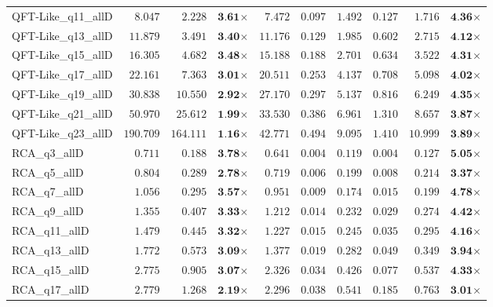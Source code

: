 \begin{table*}[t]
{\begin{tabular}{| l || r r c || r r r r r c |}
QFT-Like\_q11\_allD & $8.047$ & $2.228$ & $\textbf{3.61}$$\times$ & $7.472$ & $0.097$ & $1.492$ & $0.127$ & $1.716$ & $\textbf{4.36}$$\times$ \\
QFT-Like\_q13\_allD & $11.879$ & $3.491$ & $\textbf{3.40}$$\times$ & $11.176$ & $0.129$ & $1.985$ & $0.602$ & $2.715$ & $\textbf{4.12}$$\times$ \\
QFT-Like\_q15\_allD & $16.305$ & $4.682$ & $\textbf{3.48}$$\times$ & $15.188$ & $0.188$ & $2.701$ & $0.634$ & $3.522$ & $\textbf{4.31}$$\times$ \\
QFT-Like\_q17\_allD & $22.161$ & $7.363$ & $\textbf{3.01}$$\times$ & $20.511$ & $0.253$ & $4.137$ & $0.708$ & $5.098$ & $\textbf{4.02}$$\times$ \\
QFT-Like\_q19\_allD & $30.838$ & $10.550$ & $\textbf{2.92}$$\times$ & $27.170$ & $0.297$ & $5.137$ & $0.816$ & $6.249$ & $\textbf{4.35}$$\times$ \\
QFT-Like\_q21\_allD & $50.970$ & $25.612$ & $\textbf{1.99}$$\times$ & $33.530$ & $0.386$ & $6.961$ & $1.310$ & $8.657$ & $\textbf{3.87}$$\times$ \\
QFT-Like\_q23\_allD & $190.709$ & $164.111$ & $\textbf{1.16}$$\times$ & $42.771$ & $0.494$ & $9.095$ & $1.410$ & $10.999$ & $\textbf{3.89}$$\times$ \\
RCA\_q3\_allD & $0.711$ & $0.188$ & $\textbf{3.78}$$\times$ & $0.641$ & $0.004$ & $0.119$ & $0.004$ & $0.127$ & $\textbf{5.05}$$\times$ \\
RCA\_q5\_allD & $0.804$ & $0.289$ & $\textbf{2.78}$$\times$ & $0.719$ & $0.006$ & $0.199$ & $0.008$ & $0.214$ & $\textbf{3.37}$$\times$ \\
RCA\_q7\_allD & $1.056$ & $0.295$ & $\textbf{3.57}$$\times$ & $0.951$ & $0.009$ & $0.174$ & $0.015$ & $0.199$ & $\textbf{4.78}$$\times$ \\
RCA\_q9\_allD & $1.355$ & $0.407$ & $\textbf{3.33}$$\times$ & $1.212$ & $0.014$ & $0.232$ & $0.029$ & $0.274$ & $\textbf{4.42}$$\times$ \\
RCA\_q11\_allD & $1.479$ & $0.445$ & $\textbf{3.32}$$\times$ & $1.227$ & $0.015$ & $0.245$ & $0.035$ & $0.295$ & $\textbf{4.16}$$\times$ \\
RCA\_q13\_allD & $1.772$ & $0.573$ & $\textbf{3.09}$$\times$ & $1.377$ & $0.019$ & $0.282$ & $0.049$ & $0.349$ & $\textbf{3.94}$$\times$ \\
RCA\_q15\_allD & $2.775$ & $0.905$ & $\textbf{3.07}$$\times$ & $2.326$ & $0.034$ & $0.426$ & $0.077$ & $0.537$ & $\textbf{4.33}$$\times$ \\
RCA\_q17\_allD & $2.779$ & $1.268$ & $\textbf{2.19}$$\times$ & $2.296$ & $0.038$ & $0.541$ & $0.185$ & $0.763$ & $\textbf{3.01}$$\times$ \\

\end{tabular}}
\end{table*}
